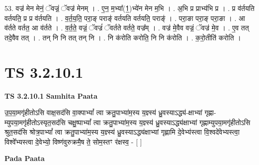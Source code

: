\documentclass[17pt]{extarticle}
\begin{document}
53. वज्र॑ मेन मेनं॒ ॅवज्रं॒ ॅवज्र॑ मेनम् । . ए॒न॒ म॒भ्या᳚(1॒)भ्ये॑न मेन म॒भि । . अ॒भि प्र प्राभ्य॑भि प्र । . प्र व॑र्तयति वर्तयति॒ प्र प्र व॑र्तयति । . व॒र्त॒य॒ति॒ परा॒ङ् पराङ्॑ वर्तयति वर्तयति॒ पराङ्॑ । . परा॒ङा परा॒ङ् परा॒ङा । . आ व॑र्तते वर्तत॒ आ व॑र्तते । . व॒र्त॒ते॒ वज्रं॒ ॅवज्रं॑ ॅवर्तते वर्तते॒ वज्र᳚म् । . वज्र॑ मे॒वैव वज्रं॒ ॅवज्र॑ मे॒व । . ए॒व तत् तदे॒वैव तत् । . तन् नि नि तत् तन् नि । . नि क॑रोति करोति॒ नि नि क॑रोति । . क॒रो॒तीति॑ करोति । \newline


\section{ TS 3.2.10.1 }

\textbf{TS 3.2.10.1 } \newline
\textbf{Samhita Paata} \newline

उ॒प॒या॒मगृ॑हीतोऽसि वाक्ष॒सद॑सि वा॒क्पाभ्यां᳚ त्वा क्रतु॒पाभ्या॑म॒स्य य॒ज्ञ्स्य॑ ध्रु॒वस्याऽद्ध्य॑-क्षाभ्यां गृह्णा-म्युपया॒मगृ॑हीतोऽस्यृत॒सद॑सि चक्षु॒ष्पाभ्यां᳚ त्वा क्रतु॒पाभ्या॑म॒स्य य॒ज्ञ्स्य॑ ध्रु॒वस्याऽद्ध्य॑क्षाभ्यां गृह्णाम्युपया॒मगृ॑हीतोऽसि श्रुत॒सद॑सि श्रोत्र॒पाभ्यां᳚ त्वा क्रतु॒पाभ्या॑म॒स्य य॒ज्ञ्स्य॑ ध्रु॒वस्याऽद्ध्य॑क्षाभ्यां गृह्णामि दे॒वेभ्य॑स्त्वा वि॒श्वदे॑वेभ्यस्त्वा॒ विश्वे᳚भ्यस्त्वा दे॒वेभ्यो॒ विष्ण॑वुरुक्रमै॒ष ते॒ सोम॒स्तꣳ र॑क्षस्व॒ - [  ] \newline

\textbf{Pada Paata} \newline
\end{document}
